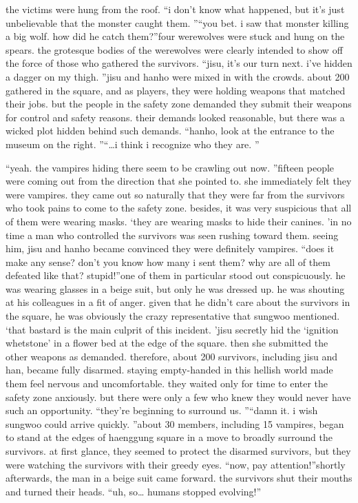  the victims were hung from the roof.
“i don’t know what happened, but it’s just unbelievable that the monster caught them.
”“you bet.
 i saw that monster killing a big wolf.
 how did he catch them?”four werewolves were stuck and hung on the spears.
 the grotesque bodies of the werewolves were clearly intended to show off the force of those who gathered the survivors.
“jisu, it’s our turn next.
 i’ve hidden a dagger on my thigh.
”jisu and hanho were mixed in with the crowds.
 about 200 gathered in the square, and as players, they were holding weapons that matched their jobs.
 but the people in the safety zone demanded they submit their weapons for control and safety reasons.
 their demands looked reasonable, but there was a wicked plot hidden behind such demands.
“hanho, look at the entrance to the museum on the right.
”“…i think i recognize who they are.
”

“yeah.
 the vampires hiding there seem to be crawling out now.
”fifteen people were coming out from the direction that she pointed to.
 she immediately felt they were vampires.
 they came out so naturally that they were far from the survivors who took pains to come to the safety zone.
 besides, it was very suspicious that all of them were wearing masks.
‘they are wearing masks to hide their canines.
’in no time a man who controlled the survivors was seen rushing toward them.
seeing him, jisu and hanho became convinced they were definitely vampires.
“does it make any sense? don’t you know how many i sent them? why are all of them defeated like that? stupid!”one of them in particular stood out conspicuously.
 he was wearing glasses in a beige suit, but only he was dressed up.
 he was shouting at his colleagues in a fit of anger.
 given that he didn’t care about the survivors in the square, he was obviously the crazy representative that sungwoo mentioned.
‘that bastard is the main culprit of this incident.
’jisu secretly hid the ‘ignition whetstone’ in a flower bed at the edge of the square.
then she submitted the other weapons as demanded.
 therefore, about 200 survivors, including jisu and han, became fully disarmed.
staying empty-handed in this hellish world made them feel nervous and uncomfortable.
 they waited only for time to enter the safety zone anxiously.
 but there were only a few who knew they would never have such an opportunity.
“they’re beginning to surround us.
”“damn it.
 i wish sungwoo could arrive quickly.
”about 30 members, including 15 vampires, began to stand at the edges of haenggung square in a move to broadly surround the survivors.
 at first glance, they seemed to protect the disarmed survivors, but they were watching the survivors with their greedy eyes.
“now, pay attention!”shortly afterwards, the man in a beige suit came forward.
 the survivors shut their mouths and turned their heads.
“uh, so… humans stopped evolving!”

 